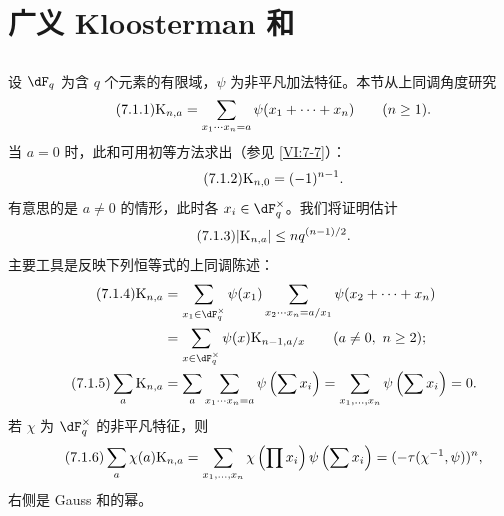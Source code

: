 \section{广义 Kloosterman 和}\label{VI:7}

\subsection{}\label{VI:7-1}
设 $\dF_q$ 为含 $q$ 个元素的有限域，$\psi$ 为非平凡加法特征。本节从上同调角度研究
\begin{equation*}\tag{7.1.1}\label{VI;eq:7-1-1}
\textnormal{K}_{n,a}=\sum_{x_1\cdots x_n=a}\psi(x_1+\cdots+x_n)
\qquad(n\ge1).
\end{equation*}
当 $a=0$ 时，此和可用初等方法求出（参见 \ref{VI:7-7}）：
\begin{equation*}\tag{7.1.2}\label{VI:eq:7-1-2}
\textnormal{K}_{n,0}=(-1)^{n-1}.
\end{equation*}
有意思的是 $a\ne0$ 的情形，此时各 $x_i\in\dF_q^\times$。我们将证明估计
\begin{equation*}\tag{7.1.3}\label{VI:eq:7-1-3}
|\textnormal{K}_{n,a}|\le nq^{(n-1)/2}.
\end{equation*}
主要工具是反映下列恒等式的上同调陈述：
\begin{align*}\tag{7.1.4}\label{VI:eq:7-1-4}
\kloos_{n,a}
&=\sum_{x_1\in\dF_q^\times}\psi(x_1)
 \sum_{x_2\cdots x_n=a/x_1}\psi(x_2+\cdots+x_n)\\\notag
&=\sum_{x\in\dF_q^\times}\psi(x)\kloos_{n-1,a/x}
\qquad(a\ne0,\ n\ge2);\\
\tag{7.1.5}\label{VI:eq:7-1-5}
\sum_a\kloos_{n,a}
&=\sum_a\sum_{x_1\cdots x_n=a}\psi\left(\sum x_i\right)
=\sum_{x_1,\ldots,x_n}\psi\left(\sum x_i\right)=0.
\end{align*}
若 $\chi$ 为 $\dF_q^\times$ 的非平凡特征，则
\begin{equation*}\tag{7.1.6}\label{VI:eq:7-1-6}
\sum_a\chi(a)\textnormal{K}_{n,a}
=\sum_{x_1,\ldots,x_n}\chi\left(\prod x_i\right)\psi\left(\sum x_i\right)
=(-\tau(\chi^{-1},\psi))^n,
\end{equation*}
右侧是 Gauss 和的幂。

